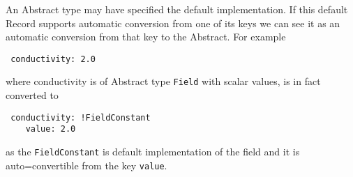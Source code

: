 An Abstract type may have specified the default implementation. If this default Record supports automatic conversion from one of its keys
we can see it as an automatic conversion from that key to the Abstract. For example
\begin{verbatim}
 conductivity: 2.0
\end{verbatim}
where conductivity is of Abstract type \verb'Field' with scalar values, is in fact converted to
\begin{verbatim}
 conductivity: !FieldConstant
    value: 2.0
\end{verbatim}
as the \verb'FieldConstant' is default implementation of the field and it is auto=convertible from the key \verb'value'. 





%





